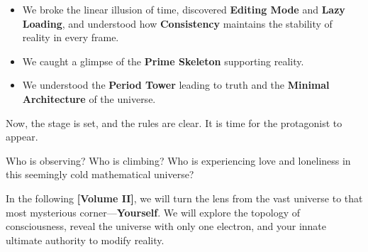 \begin{itemize}
\item We broke the linear illusion of time, discovered \textbf{Editing Mode} and \textbf{Lazy Loading}, and understood how \textbf{Consistency} maintains the stability of reality in every frame.
\item We caught a glimpse of the \textbf{Prime Skeleton} supporting reality.
\item We understood the \textbf{Period Tower} leading to truth and the \textbf{Minimal Architecture} of the universe.
\end{itemize}

Now, the stage is set, and the rules are clear. It is time for the protagonist to appear.

Who is observing? Who is climbing? Who is experiencing love and loneliness in this seemingly cold mathematical universe?

In the following \textbf{[Volume II]}, we will turn the lens from the vast universe to that most mysterious corner—\textbf{Yourself}. We will explore the topology of consciousness, reveal the universe with only one electron, and your innate ultimate authority to modify reality.

